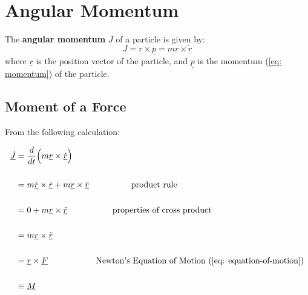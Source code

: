 \section{Angular Momentum}

\begin{definition}
	The {\bf angular momentum} $\underline{J}$ of a particle is given by:
	\begin{equation}
		\label{eq: angular-momentum}
		\underline{J} = \underline{r} \times \underline{p} = m\underline{{r}} \times \underline{\dot{r}}
	\end{equation}
	where $\underline{r}$ is the position vector of the particle, and $\underline{p}$ is the momentum (\ref{eq: momentum}) of the particle.
\end{definition}

\clearpage
\subsection{Moment of a Force}
From the following calculation:

$$\begin{aligned} \underline{\dot{J}} & = \frac{d}{dt}\Big(m\underline{{r}} \times \underline{\dot{r}}\Big)                                                                      \\ \\ &= m\underline{\dot{r}} \times \underline{\dot{r}} + m\underline{{r}} \times \underline{\ddot{r}}\ \ \ \ \ \ \ \ \ \ \ \ \ \ \ \text{product rule} \\ \\
                                    & = 0 + m\underline{r}  \times \underline{\ddot{r}} \ \ \ \ \ \ \ \ \ \ \ \ \ \ \ \ \text{properties of cross product}                     \\ \\
                                    & = m\underline{r} \times \underline{\ddot{r}}                                                                                             \\\\
                                    & = \underline{r} \times \underline{F} \ \ \ \ \ \ \ \ \ \ \ \ \ \ \ \ \ \text{Newton's Equation of Motion (\ref{eq: equation-of-motion})} \\ \\
                                    & \equiv  \underline{M}
	\end{aligned}$$

